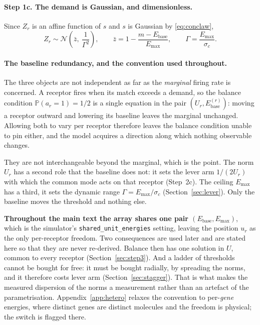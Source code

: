 \documentclass[11pt,a4paper]{article}
\newcommand{\PP}{\mathbb{P}}
\newcommand{\Ebase}{E_{\mathrm{base}}}
\newcommand{\Emax}{E_{\mathrm{max}}}
\begin{document}
\paragraph{Step 1c. The demand is Gaussian, and dimensionless.} Since $Z_r$ is an affine
function of $s$ and $s$ is Gaussian by \eqref{eq:conclaw},
\begin{equation}
  Z_r \sim \mathcal{N}\!\left(\bar z,\ \frac{1}{\Gamma^{2}}\right),
  \qquad
  \bar z = 1 - \frac{m - \Ebase}{\Emax},
  \qquad
  \Gamma = \frac{\Emax}{\sigma_c}.
  \label{eq:Zlaw}
\end{equation}
\paragraph{The baseline redundancy, and the convention used throughout.} The three
objects are not independent as far as the \emph{marginal} firing rate is concerned. A
receptor fires when its match exceeds a demand, so the balance condition $\PP(a_r=1)=1/2$
is a single equation in the pair $(U_r,\Ebase^{(r)})$: moving a receptor outward and
lowering its baseline leaves the marginal unchanged. Allowing both to vary per receptor
therefore leaves the balance condition unable to pin either, and the model acquires a
direction along which nothing observable changes.

They are not interchangeable beyond the marginal, which is the point. The norm $U_r$ has a
second role that the baseline does not: it sets the lever arm $1/(2U_r)$ with which the
common mode acts on that receptor (Step~2c). The ceiling $\Emax$ has a third, it
sets the dynamic range $\Gamma=\Emax/\sigma_c$ (Section~\ref{sec:lever}). Only the
baseline moves the threshold and nothing else.

\textbf{Throughout the main text the array shares one pair $(\Ebase,\Emax)$}, which is the
simulator's \texttt{shared\_unit\_energies} setting, leaving the position $u_r$ as the only
per-receptor freedom. Two consequences are used later and are stated here so that they are
never re-derived. Balance then has one solution in $U$, common to every receptor
(Section~\ref{sec:step3}). And a ladder of thresholds cannot be bought for free: it must be
bought radially, by spreading the norms, and it therefore costs lever arm
(Section~\ref{sec:stagger}). That is what makes the measured dispersion of the norms a
measurement rather than an artefact of the parametrisation. Appendix~\ref{app:hetero}
relaxes the convention to per-\emph{gene} energies, where distinct genes are distinct
molecules and the freedom is physical; the switch is flagged there.
\end{document}
